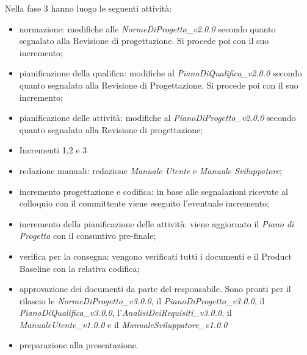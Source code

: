Nella fase 3 hanno luogo le seguenti attività:
\begin{itemize}
	\item normazione: modifiche alle \textit{NormeDiProgetto\_v2.0.0} secondo quanto segnalato alla Revisione di progettazione. Si procede poi con il suo incremento;
	\item pianificazione della qualifica: modifiche al \textit{PianoDiQualifica\_v2.0.0} secondo quanto segnalato alla Revisione di Progettazione. Si procede poi con il suo incremento;
	\item pianificazione delle attività: modifiche al \textit{PianoDiProgetto\_v2.0.0} secondo quanto segnalato alla Revisione di progettazione;
	\item Incrementi 1,2 e 3
	\item redazione manuali: redazione \textit{Manuale Utente} e \textit{Manuale Sviluppatore};
	\item incremento progettazione e codifica: in base alle segnalazioni ricevute al colloquio con il committente viene eseguito l'eventuale incremento;
	\item incremento della pianificazione delle attività: viene aggiornato il \textit{Piano di Progetto} con il consuntivo pre-finale;
	\item verifica per la consegna: vengono verificati tutti i documenti e il Product Baseline con la relativa codifica;
	\item approvazione dei documenti da parte del responsabile. Sono pronti per il rilascio le \textit{NormeDiProgetto\_v3.0.0}, il \textit{PianoDiProgetto\_v3.0.0}, il \textit{PianoDiQualifica\_v3.0.0}, l'\textit{AnalisiDeiRequisiti\_v3.0.0}, il
	\textit{ManualeUtente\_v1.0.0} e il \textit{ManualeSviluppatore\_v1.0.0}
	\item preparazione alla presentazione.
\end{itemize}

